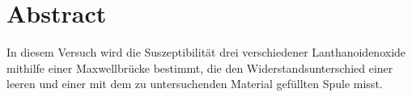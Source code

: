 \section{Abstract}
\label{sec:Abstract}

In diesem Versuch wird die Suszeptibilität drei verschiedener Lanthanoidenoxide mithilfe einer Maxwellbrücke bestimmt,
die den Widerstandsunterschied einer leeren und einer mit dem zu untersuchenden Material gefüllten Spule misst.
